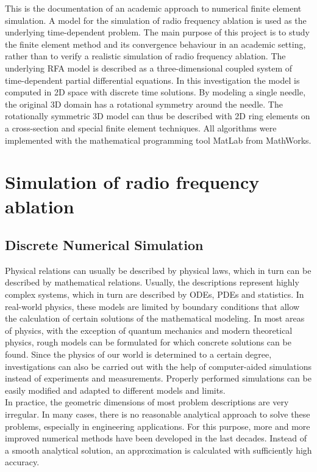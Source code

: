 \documentclass[parskip=half, titlepage=yes, 12pt, BCOR=12mm, DIV=calc]{scrartcl}
\begin{document}
This is the documentation of an academic approach to numerical finite element simulation. A model for the simulation of radio frequency ablation is used as the underlying time-dependent problem.
The main purpose of this project is to study the finite element method and its convergence behaviour in an academic setting, rather than to verify a realistic simulation of radio frequency ablation. 
The underlying RFA model is described as a three-dimensional coupled system of time-dependent partial differential equations. In this investigation the model is computed in 2D space with discrete time solutions. By modeling a single needle, the original 3D domain has a rotational symmetry around the needle. The rotationally symmetric 3D model can thus be described with 2D ring elements on a cross-section and special finite element techniques. 
All algorithms were implemented with the mathematical programming tool MatLab from MathWorks.



\section{Simulation of radio frequency ablation}

\subsection{Discrete Numerical Simulation}
Physical relations can usually be described by physical laws, which in turn can be described by mathematical relations. 
Usually, the descriptions represent highly complex systems, which in turn are described by ODEs, PDEs and statistics.
In real-world physics, these models are limited by boundary conditions that allow the calculation of certain solutions of the mathematical modeling. 
In most areas of physics, with the exception of quantum mechanics and modern theoretical physics, rough models can be formulated for which concrete solutions can be found. 
Since the physics of our world is determined to a certain degree, investigations can also be carried out with the help of computer-aided simulations instead of experiments and measurements. 
Properly performed simulations can be easily modified and adapted to different models and limits. \\

In practice, the geometric dimensions of most problem descriptions are very irregular.
In many cases, there is no reasonable analytical approach to solve these problems, especially in engineering applications. For this purpose, more and more improved numerical methods have been developed in the last decades. 
Instead of a smooth analytical solution, an approximation is calculated with sufficiently high accuracy.\\
\end{document}
